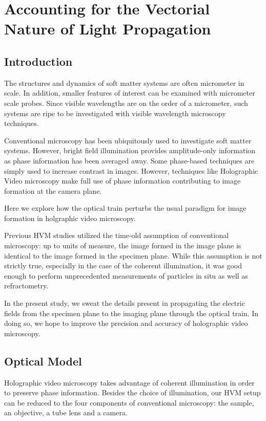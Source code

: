 \chapter{Accounting for the Vectorial Nature of Light Propagation}
\label{ch:debye}





\section{Introduction}
The structures and dynamics of soft matter systems are often micrometer in 
scale. In addition, smaller features of interest can be examined with micrometer
scale probes. Since visible wavelengths are on the order of a micrometer, such 
systems are ripe to be investigated with visible wavelength microscopy 
techniques.

Conventional microscopy has been ubiquitously used to investigate soft matter systems. However, bright field illumination provides amplitude-only information as phase information has been averaged away. Some phase-based techniques are simply used to increase contrast in images. However, techniques like Holographic Video microscopy make full use of phase information contributing to image formation at the camera plane.

Here we explore how the optical train perturbs the usual paradigm for image formation in holgraphic video microscopy. 

Previous HVM studies utilized the time-old assumption of conventional 
microscopy: up to units of measure, the image formed in the image plane is 
identical to the image formed in the specimen plane. While this assumption is 
not strictly true, especially in the case of the coherent illumination, it was good enough to perform unprecedented measurements of particles in situ as well as
refractometry.

In the present study, we sweat the details present in propagating the electric fields from the specimen plane to the imaging plane through the optical train. In doing so, we hope to improve the precision and accuracy of holographic video microscopy.

\section{Optical Model}
Holographic video microscopy takes advantage of coherent illumination in order
to preserve phase information. Besides the choice of illumination, our HVM setup can be reduced to the four components of conventional microscopy: the sample, an objective, a tube lens and a camera.

